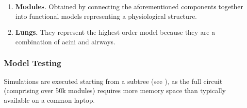 \begin{enumerate}
\item \textbf{Modules}.  Obtained by connecting the aforementioned
  components together into functional models representing a
  physiological structure.
\item \textbf{Lungs}.  They represent the highest-order model because they are a combination of
  acini and airways.
\end{enumerate}





\subsubsection{Model Testing}
\label{subsubsec:model_testing}

Simulations are executed starting from a subtree (see
\cite{fig:subtree_development}), as the full circuit (comprising over
50k modules) requires more memory space than typically available on a
common laptop.






